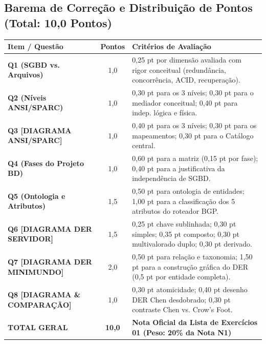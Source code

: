 \documentclass[11pt,a4paper]{article}
\begin{document}
\subsection*{Barema de Correção e Distribuição de Pontos (Total: 10,0 Pontos)}
\begin{center}
\footnotesize
\begin{tabularx}{\textwidth}{l c X}
\toprule
\textbf{Item / Questão} & \textbf{Pontos} & \textbf{Critérios de Avaliação} \\
\midrule
\textbf{Q1 (SGBD vs. Arquivos)} & 1,0 & 0,25 pt por dimensão avaliada com rigor conceitual (redundância, concorrência, ACID, recuperação). \\
\textbf{Q2 (Níveis ANSI/SPARC)} & 1,0 & 0,30 pt para os 3 níveis; 0,30 pt para o mediador conceitual; 0,40 pt para indep. lógica e física. \\
\textbf{Q3 [DIAGRAMA ANSI/SPARC]} & 1,0 & 0,40 pt para os 3 níveis; 0,30 pt para os mapeamentos; 0,30 pt para o Catálogo central. \\
\textbf{Q4 (Fases do Projeto BD)} & 1,0 & 0,60 pt para a matriz (0,15 pt por fase); 0,40 pt para a justificativa da independência de SGBD. \\
\textbf{Q5 (Ontologia e Atributos)} & 1,5 & 0,50 pt para ontologia de entidades; 1,00 pt para a classificação dos 5 atributos do roteador BGP. \\
\textbf{Q6 [DIAGRAMA DER SERVIDOR]} & 1,5 & 0,25 pt chave sublinhada; 0,30 pt simples; 0,35 pt composto; 0,30 pt multivalorado duplo; 0,30 pt derivado. \\
\textbf{Q7 [DIAGRAMA DER MINIMUNDO]} & 2,0 & 0,50 pt para relação e taxonomia; 1,50 pt para a construção gráfica do DER (0,5 pt por entidade completa). \\
\textbf{Q8 [DIAGRAMA \& COMPARAÇÃO]} & 1,0 & 0,30 pt atomicidade; 0,40 pt desenho DER Chen desdobrado; 0,30 pt contraste Chen vs. Crow's Foot. \\
\midrule
\textbf{TOTAL GERAL} & \textbf{10,0} & \textbf{Nota Oficial da Lista de Exercícios 01 (Peso: 20\% da Nota N1)} \\
\bottomrule
\end{tabularx}
\end{center}
\end{document}
